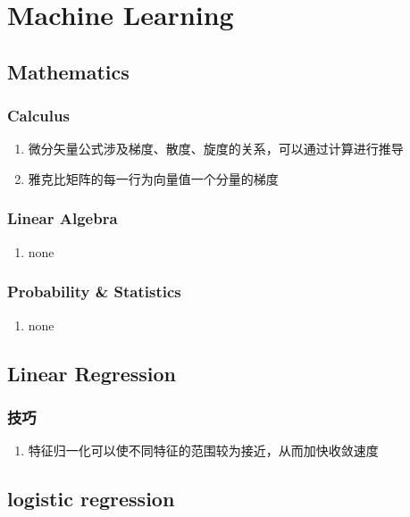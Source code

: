 \documentclass[onecolumn]{article}
\begin{document}
\section{Machine Learning}
    \subsection{Mathematics}
        \subsubsection{Calculus}
            \noindent
            \begin{enumerate}
                \item 微分矢量公式涉及梯度、散度、旋度的关系，可以通过计算进行推导
                \item 雅克比矩阵的每一行为向量值一个分量的梯度
            \end{enumerate}
        \subsubsection{Linear Algebra}
            \noindent
            \begin{enumerate}
                \item none
            \end{enumerate}
        \subsubsection{Probability \& Statistics}
            \noindent
            \begin{enumerate}
                \item none
            \end{enumerate}
    \subsection{Linear Regression}
        \subsubsection{技巧}
            \noindent
            \begin{enumerate}
                \item 特征归一化可以使不同特征的范围较为接近，从而加快收敛速度
            \end{enumerate}
    \subsection{logistic regression}
\end{document}
